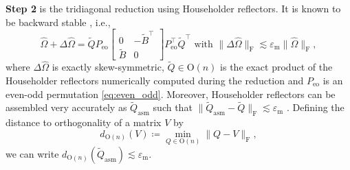 \documentclass[10pt,twoside,dvipsnames]{siamart1116}
\numberwithin{algorithm}{section}
\numberwithin{equation}{section}
\begin{document}
	\textbf{Step 2} is %
the tridiagonal reduction using Householder reflectors. It is known to be backward stable \cite[p.~416]{GoluVanl96}, i.e.,%
	\begin{equation}\label{eq:backward_stability}
		\widehat{\Omega} + \Delta\widehat{\Omega} = \widetilde{Q}P_{\mathrm{eo}}\left[\begin{smallmatrix}
		0&-\widetilde{B}^\top \\
		\widetilde{B}&0
		\end{smallmatrix}\right] P_{\mathrm{eo}}^\top \widetilde{Q}^\top  \text{ with } \|\Delta\widehat{\Omega}\|_\mathrm{F}\lesssim \varepsilon_\mathrm{m}\|\widehat{\Omega}\|_\mathrm{F},
	\end{equation}
	where $\Delta\widehat{\Omega}$ is exactly skew-symmetric, $\widetilde{Q}\in\mathrm{O}(n)$ is the exact product of the Householder reflectors numerically computed during the reduction and $P_{\mathrm{eo}}$ is an even-odd permutation \eqref{eq:even_odd}. Moreover, Householder reflectors can be assembled very accurately as $\widetilde{Q}_{\mathrm{asm}}$ such that $\|\widetilde{Q}_{\mathrm{asm}}-\widetilde{Q}\|_\mathrm{F} \lesssim \varepsilon_\mathrm{m}$ \cite[Eq.~19.13]{Higham2002}. Defining the distance to orthogonality of a matrix $V$ by 
	\begin{equation}\label{eq:dist_to_orthogonality}
	d_{\mathrm{O}(n)}(V)\coloneq\min_{Q\in\mathrm{O}(n)} \|Q-V\|_\mathrm{F},
	\end{equation} 
we can write $d_{\mathrm{O}(n)}(\widetilde{Q}_\mathrm{asm})\lesssim\varepsilon_\mathrm{m}$.%
\end{document}
